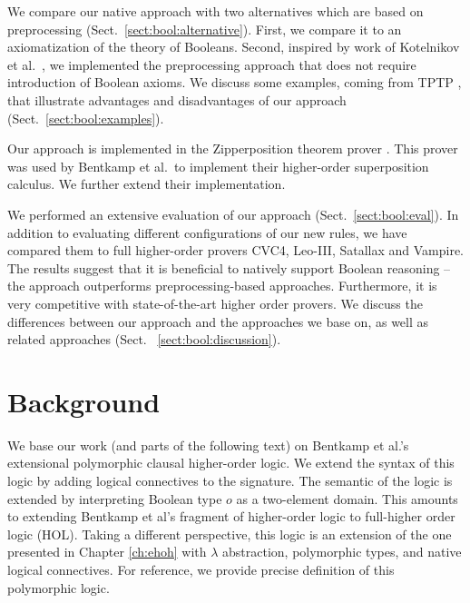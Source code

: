 We compare our native approach with two alternatives which are based on
preprocessing (Sect.~\ref{sect:bool:alternative}). First, we compare it to  an
axiomatization of the theory of Booleans. Second, inspired by work of
Kotelnikov et al.\ \cite{kotelnikov-16-fool}, we implemented the preprocessing approach that does not
require introduction of Boolean axioms.
We discuss some examples, coming from TPTP \cite{gs-17-tptp}, that
illustrate advantages and disadvantages of our approach (Sect.~\ref{sect:bool:examples}).

Our approach is implemented in the Zipperposition theorem prover
\cite{sc-15-simon-phd,sc-supind-17}. This prover was used by Bentkamp et al.\
to implement their higher-order superposition calculus. We further extend
their implementation.

We performed an extensive evaluation of our approach (Sect.~\ref{sect:bool:eval}).
In addition to evaluating different configurations of our new rules, we have
compared them to full higher-order provers CVC4, Leo-III,  Satallax and Vampire.
The results suggest that it is beneficial to natively support Boolean reasoning
-- the approach outperforms preprocessing-based approaches. Furthermore, it is
very competitive with state-of-the-art higher order provers. We discuss the differences between our approach and the
approaches we base on, as well as related approaches (Sect.~
\ref{sect:bool:discussion}).


\section{Background} 
\label{sect:bool:background}

We base our work (and parts of the following text) on Bentkamp et al.'s \cite{bbtvw-21-sup-lam} extensional
polymorphic clausal higher-order logic. We extend the syntax of this logic by
adding logical connectives to the signature. The semantic of the logic
is extended by interpreting Boolean type $o$ as a two-element domain. This
amounts to extending Bentkamp et al's fragment of higher-order logic to
full-higher order logic (HOL). Taking a different perspective, this logic is an extension of the one
presented in Chapter \ref{ch:ehoh} with $\lambda$ abstraction, polymorphic
types, and native logical connectives. For reference, we provide precise definition of this polymorphic logic.

